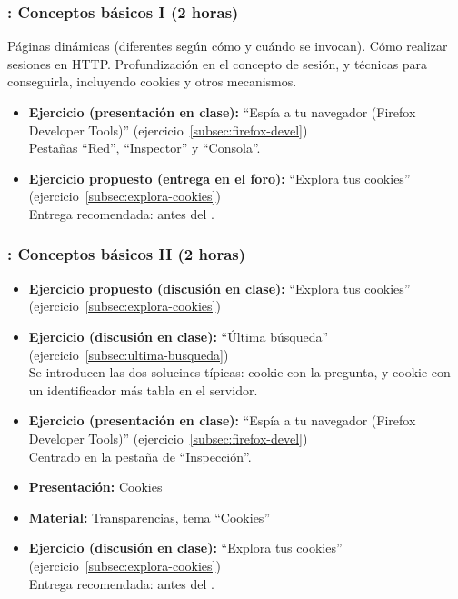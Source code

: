 \documentclass[a4paper,12pt]{article}
\begin{document}
\subsubsection{\juevesA: Conceptos básicos I (2 horas)}
\label{cal:juevesA}

Páginas dinámicas (diferentes según cómo y cuándo se invocan). Cómo realizar sesiones en HTTP. Profundización en el concepto de sesión, y técnicas para conseguirla, incluyendo cookies y otros mecanismos.

\begin{itemize}
\item \textbf{Ejercicio (presentación en clase):} ``Espía a tu navegador (Firefox Developer Tools)'' (ejercicio~\ref{subsec:firefox-devel}) \\
  Pestañas ``Red'', ``Inspector'' y ``Consola''.
\item \textbf{Ejercicio propuesto (entrega en el foro):} ``Explora tus cookies'' (ejercicio~\ref{subsec:explora-cookies}) \\
  Entrega recomendada: antes del \juevesB.
\end{itemize}


\subsubsection{\juevesB: Conceptos básicos II (2 horas)}
\label{cal:juevesB}

\begin{itemize}
\item \textbf{Ejercicio propuesto (discusión en clase):} ``Explora tus cookies'' (ejercicio~\ref{subsec:explora-cookies}) \\
\item \textbf{Ejercicio (discusión en clase):} ``Última búsqueda'' (ejercicio~\ref{subsec:ultima-busqueda}) \\
  Se introducen las dos solucines típicas: cookie con la pregunta, y cookie con un identificador más tabla en el servidor.
\item \textbf{Ejercicio (presentación en clase):} ``Espía a tu navegador (Firefox Developer Tools)'' (ejercicio~\ref{subsec:firefox-devel}) \\
  Centrado en la pestaña de ``Inspección''.
\item \textbf{Presentación:} Cookies
\item \textbf{Material:} Transparencias, tema ``Cookies''
\item \textbf{Ejercicio (discusión en clase):} ``Explora tus cookies'' (ejercicio~\ref{subsec:explora-cookies}) \\
  Entrega recomendada: antes del \juevesC. \\
\end{itemize}
\end{document}
